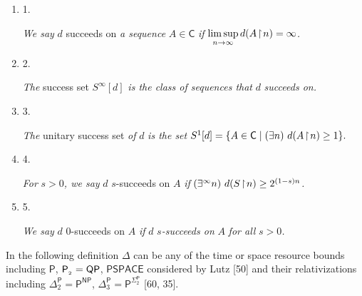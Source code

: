 \begin{enumerate}


\item[] 
1. 


\emph{We say }$d$\emph{ }succeeds on\emph{ a sequence }$A\in\mathsf{C}$\emph{ if }$\limsup\limits_{n\to\infty}d(A\negthinspace\upharpoonright\negthinspace n)=\infty$\emph{.}\par





\item[] 
2. 


\emph{The }success set\emph{ }$S^{\infty}[d]$\emph{ is the class of sequences that }$d$\emph{ succeeds on.}\par





\item[] 
3. 


\emph{The }unitary success set\emph{ of }$d$\emph{ is the set
}$S^{1}[d]=\{A\in\mathsf{C}\mid(\exists n)\ d(A\negthinspace\upharpoonright\negthinspace n)\geq 1\}.$\emph{}\par





\item[] 
4. 


\emph{For }$s>0$\emph{, we say }$d$\emph{ }$s$-succeeds on\emph{ }$A$\emph{ if }$(\exists^{\infty}n)\ d(S\negthinspace\upharpoonright\negthinspace n)\geq 2^{(1-s)n}$\emph{.}\par





\item[] 
5. 


\emph{We say }$d$\emph{ }$0$-succeeds on\emph{ }$A$\emph{ if }$d$\emph{ }$s$\emph{-succeeds on }$A$\emph{ for all }$s>0$\emph{.}\par





\end{enumerate}






In the following definition $\Delta$ can be any of the time or space resource bounds including $\mathsf{P}$, ${\mathsf{P}_{\thinspace\negthinspace{}_{2}}}=\mathsf{QP}$, $\mathsf{PSPACE}$ considered by Lutz [50] and their relativizations including ${\Delta^{\mathsf{P}}_{2}}=\mathsf{P}^{\mathsf{NP}}$, ${\Delta^{\mathsf{P}}_{3}}=\mathsf{P}^{\Sigma^{\mathsf{P}}_{2}}$ [60, 35].\par



